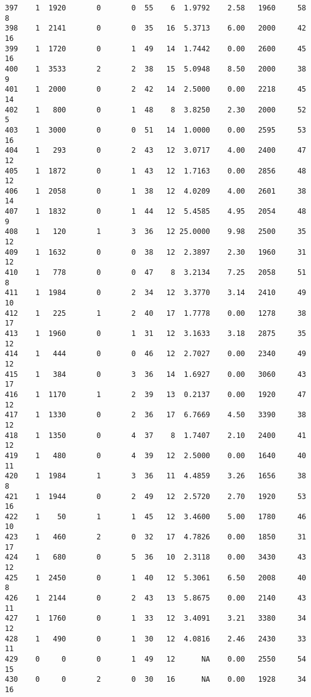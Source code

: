 \documentclass[
  letterpaper,
  DIV=11,
  numbers=noendperiod]{scrreprt}
\begin{document}
\begin{verbatim}
397    1  1920       0       0  55    6  1.9792    2.58   1960     58       8
398    1  2141       0       0  35   16  5.3713    6.00   2000     42      16
399    1  1720       0       1  49   14  1.7442    0.00   2600     45      16
400    1  3533       2       2  38   15  5.0948    8.50   2000     38       9
401    1  2000       0       2  42   14  2.5000    0.00   2218     45      14
402    1   800       0       1  48    8  3.8250    2.30   2000     52       5
403    1  3000       0       0  51   14  1.0000    0.00   2595     53      16
404    1   293       0       2  43   12  3.0717    4.00   2400     47      12
405    1  1872       0       1  43   12  1.7163    0.00   2856     48      12
406    1  2058       0       1  38   12  4.0209    4.00   2601     38      14
407    1  1832       0       1  44   12  5.4585    4.95   2054     48       9
408    1   120       1       3  36   12 25.0000    9.98   2500     35      12
409    1  1632       0       0  38   12  2.3897    2.30   1960     31      12
410    1   778       0       0  47    8  3.2134    7.25   2058     51       8
411    1  1984       0       2  34   12  3.3770    3.14   2410     49      10
412    1   225       1       2  40   17  1.7778    0.00   1278     38      17
413    1  1960       0       1  31   12  3.1633    3.18   2875     35      12
414    1   444       0       0  46   12  2.7027    0.00   2340     49      12
415    1   384       0       3  36   14  1.6927    0.00   3060     43      17
416    1  1170       1       2  39   13  0.2137    0.00   1920     47      12
417    1  1330       0       2  36   17  6.7669    4.50   3390     38      12
418    1  1350       0       4  37    8  1.7407    2.10   2400     41      12
419    1   480       0       4  39   12  2.5000    0.00   1640     40      11
420    1  1984       1       3  36   11  4.4859    3.26   1656     38       8
421    1  1944       0       2  49   12  2.5720    2.70   1920     53      16
422    1    50       1       1  45   12  3.4600    5.00   1780     46      10
423    1   460       2       0  32   17  4.7826    0.00   1850     31      17
424    1   680       0       5  36   10  2.3118    0.00   3430     43      12
425    1  2450       0       1  40   12  5.3061    6.50   2008     40       8
426    1  2144       0       2  43   13  5.8675    0.00   2140     43      11
427    1  1760       0       1  33   12  3.4091    3.21   3380     34      12
428    1   490       0       1  30   12  4.0816    2.46   2430     33      11
429    0     0       0       1  49   12      NA    0.00   2550     54      15
430    0     0       2       0  30   16      NA    0.00   1928     34      16

\end{verbatim}
\end{document}
